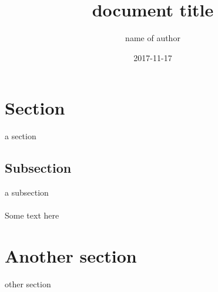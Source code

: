 \documentclass{article}
\title{document title}
\date{2017-11-17}
\author{name of author}
\begin{document}
	\maketitle
	
	\section{Section}
	a section
	
	\subsection{Subsection}
	a subsection

	\paragraph{}
	Some text here

	\section{Another section}
	other section
\end{document}
